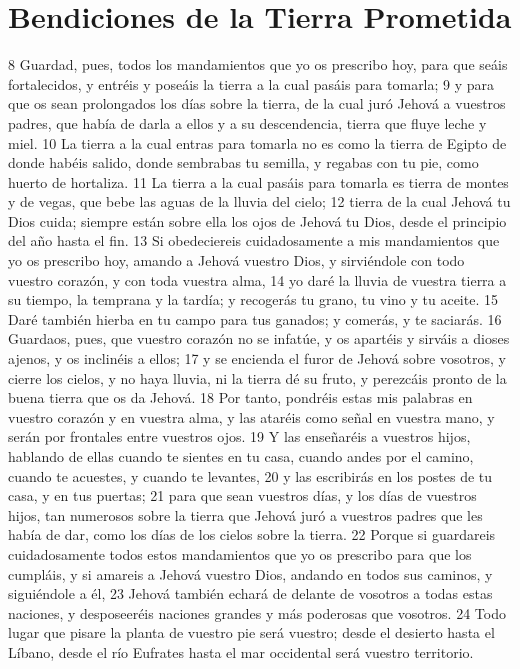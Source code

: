 \section{Bendiciones de la Tierra Prometida}

8 Guardad, pues, todos los mandamientos que yo os prescribo hoy, para que seáis fortalecidos, y entréis y poseáis la tierra a la cual pasáis para tomarla;
9 y para que os sean prolongados los días sobre la tierra, de la cual juró Jehová a vuestros padres, que había de darla a ellos y a su descendencia, tierra que fluye leche y miel.
10 La tierra a la cual entras para tomarla no es como la tierra de Egipto de donde habéis salido, donde sembrabas tu semilla, y regabas con tu pie, como huerto de hortaliza.
11 La tierra a la cual pasáis para tomarla es tierra de montes y de vegas, que bebe las aguas de la lluvia del cielo;
12 tierra de la cual Jehová tu Dios cuida; siempre están sobre ella los ojos de Jehová tu Dios, desde el principio del año hasta el fin.
13 Si obedeciereis cuidadosamente a mis mandamientos que yo os prescribo hoy, amando a Jehová vuestro Dios, y sirviéndole con todo vuestro corazón, y con toda vuestra alma,
14 yo daré la lluvia de vuestra tierra a su tiempo, la temprana y la tardía; y recogerás tu grano, tu vino y tu aceite.
15 Daré también hierba en tu campo para tus ganados; y comerás, y te saciarás.
16 Guardaos, pues, que vuestro corazón no se infatúe, y os apartéis y sirváis a dioses ajenos, y os inclinéis a ellos;
17 y se encienda el furor de Jehová sobre vosotros, y cierre los cielos, y no haya lluvia, ni la tierra dé su fruto, y perezcáis pronto de la buena tierra que os da Jehová.
18 Por tanto, pondréis estas mis palabras en vuestro corazón y en vuestra alma, y las ataréis como señal en vuestra mano, y serán por frontales entre vuestros ojos.
19 Y las enseñaréis a vuestros hijos, hablando de ellas cuando te sientes en tu casa, cuando andes por el camino, cuando te acuestes, y cuando te levantes,
20 y las escribirás en los postes de tu casa, y en tus puertas;
21 para que sean vuestros días, y los días de vuestros hijos, tan numerosos sobre la tierra que Jehová juró a vuestros padres que les había de dar, como los días de los cielos sobre la tierra.
22 Porque si guardareis cuidadosamente todos estos mandamientos que yo os prescribo para que los cumpláis, y si amareis a Jehová vuestro Dios, andando en todos sus caminos, y siguiéndole a él,
23 Jehová también echará de delante de vosotros a todas estas naciones, y desposeeréis naciones grandes y más poderosas que vosotros.
24 Todo lugar que pisare la planta de vuestro pie será vuestro; desde el desierto hasta el Líbano, desde el río Eufrates hasta el mar occidental será vuestro territorio.
